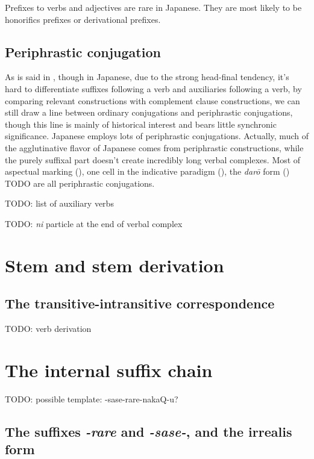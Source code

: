 \documentclass[UTF8, a4paper, oneside, scheme=plain]{ctexrep}
\newcommand{\corpus}[1]{\emph{#1}}
\begin{document}
Prefixes to verbs and adjectives are rare in Japanese.
They are most likely to be honorifics prefixes or derivational prefixes.

\subsection{Periphrastic conjugation}\label{sec:periphrastic}

As is said in ,
though in Japanese, 
due to the strong head-final tendency,
it's hard to differentiate
suffixes following a verb and auxiliaries following a verb,
by comparing relevant constructions with complement clause constructions, 
we can still draw a line between ordinary conjugations and periphrastic conjugations,
though this line is mainly of historical interest and bears little synchronic significance.
Japanese employs lots of periphrastic conjugations.
Actually, much of the agglutinative flavor of Japanese comes from periphrastic constructions,
while the purely suffixal part doesn't create incredibly long verbal complexes.
Most of aspectual marking (), 
one cell in the indicative paradigm (), 
the \corpus{{dar\={o}}} form () TODO 
are all periphrastic conjugations.

TODO: list of auxiliary verbs

TODO: \corpus{ni} particle at the end of verbal complex

\section{Stem and stem derivation}\label{sec:verb-stem}

\subsection{The transitive-intransitive correspondence}

TODO: verb derivation

\section{The internal suffix chain}\label{sec:internal-suffix-chain}

TODO: possible template: -sase-rare-nakaQ-u?

\subsection{The suffixes \corpus{-rare} and \corpus{-sase-}, and the irrealis form}\label{sec:valency-irrealis}
\end{document}
